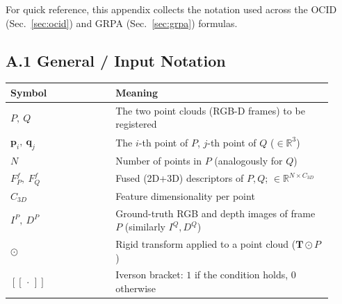 \documentclass[11pt,a4paper]{article}
\begin{document}
For quick reference, this appendix collects the notation used across the OCID
(Sec.~\ref{sec:ocid}) and GRPA (Sec.~\ref{sec:grpa}) formulas.

\subsection*{A.1 General / Input Notation}
\begin{center}
\begin{tabular}{@{}p{0.3\linewidth}p{0.62\linewidth}@{}}
\toprule
Symbol & Meaning \\
\midrule
$P,\ Q$ & The two point clouds (RGB-D frames) to be registered \\
$\mathbf{p}_i,\ \mathbf{q}_j$ & The $i$-th point of $P$, $j$-th point of $Q$ ($\in\mathbb{R}^3$) \\
$N$ & Number of points in $P$ (analogously for $Q$) \\
$F_P^f,\ F_Q^f$ & Fused (2D+3D) descriptors of $P,Q$; $\in\mathbb{R}^{N\times C_{3D}}$ \\
$C_{3D}$ & Feature dimensionality per point \\
$I^P,\ D^P$ & Ground-truth RGB and depth images of frame $P$ (similarly $I^Q,D^Q$) \\
$\odot$ & Rigid transform applied to a point cloud ($\mathbf{T}\odot P$) \\
$[\![\,\cdot\,]\!]$ & Iverson bracket: $1$ if the condition holds, $0$ otherwise \\
\bottomrule
\end{tabular}
\end{center}
\end{document}
